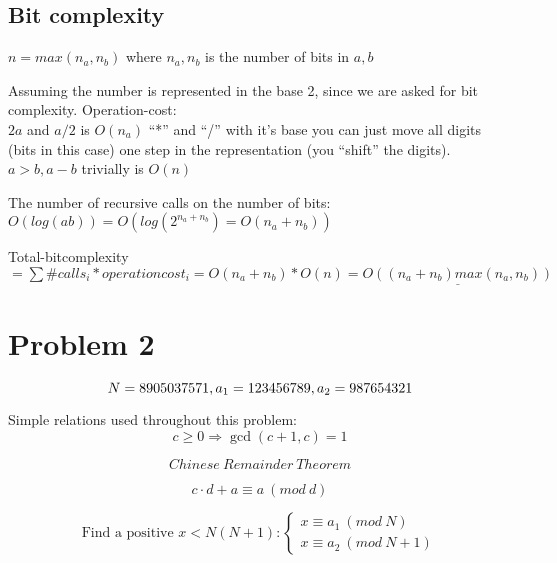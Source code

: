 \documentclass[a4paper,twoside=false,abstract=false,numbers=noenddot,
titlepage=false,headings=small,parskip=half,version=last]{scrartcl}
\begin{document}
\subsection{Bit complexity}

$n=max(n_a,n_b)$ where $n_a,n_b$ is the number of bits in $a,b$

Assuming the number is represented in the base 2, since we are asked for bit complexity.
Operation-cost:\\
$2a$ and $a/2$ is $O(n_a)$ ``*'' and ``/'' with it's base you can just move all digits (bits in this case) one step in the representation (you ``shift'' the digits).\\ 
$a>b,a-b$ trivially is $O(n)$

The number of recursive calls on the number of bits: $O(log(ab))=O(log(2^{n_a+n_b})=O(n_a+n_b))$

Total-bitcomplexity $= \sum{\#{calls_i}*{operationcost_i}} = O(n_a+n_b)*O(n) = \underline{O((n_a+n_b)max(n_a,n_b))}$

\section{Problem 2}
\begin{equation*}
    N=8905037571, \\
    a_{1}=123456789, \\
    a_{2}=987654321
\end{equation*}


Simple relations used throughout this problem: 
\begin{equation} \label{eq:gcdplusone}
    c \ge 0 \Rightarrow  \gcd(c+1,c)=1
\end{equation}

\begin{equation} \label{eq:remaindertheo}
    Chinese\ Remainder\ Theorem
\end{equation}

\begin{equation} \label{eq:modrule}
    c\cdot d+a \equiv a\ (mod\ d) 
\end{equation}

\begin{equation} \label{eq:congruenceproblem}
    \text{Find a positive } x < N(N+1) : 
    \begin{cases}
        x \equiv a_{1}\ (mod\ N)\\
        x \equiv a_{2}\ (mod\ N+1)
    \end{cases}
\end{equation}
\end{document}
